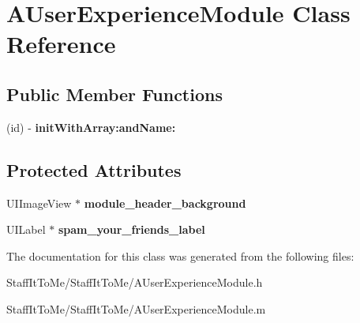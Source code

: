 \hypertarget{interface_a_user_experience_module}{
\section{\-A\-User\-Experience\-Module \-Class \-Reference}
\label{interface_a_user_experience_module}
}
\subsection*{\-Public \-Member \-Functions}
\begin{DoxyCompactItemize}
\item 
\hypertarget{interface_a_user_experience_module_ae9e5c8978fa4448560240bb2caa73ce8}{
(id) -\/ {\bfseries init\-With\-Array\-:and\-Name\-:}}
\label{interface_a_user_experience_module_ae9e5c8978fa4448560240bb2caa73ce8}

\end{DoxyCompactItemize}
\subsection*{\-Protected \-Attributes}
\begin{DoxyCompactItemize}
\item 
\hypertarget{interface_a_user_experience_module_a39f9675786872edf3d68d57eeaea9cad}{
\-U\-I\-Image\-View $\ast$ {\bfseries module\-\_\-header\-\_\-background}}
\label{interface_a_user_experience_module_a39f9675786872edf3d68d57eeaea9cad}

\item 
\hypertarget{interface_a_user_experience_module_aea8f2a9420fbb67db8236069e5de880a}{
\-U\-I\-Label $\ast$ {\bfseries spam\-\_\-your\-\_\-friends\-\_\-label}}
\label{interface_a_user_experience_module_aea8f2a9420fbb67db8236069e5de880a}

\end{DoxyCompactItemize}


\-The documentation for this class was generated from the following files\-:\begin{DoxyCompactItemize}
\item 
\-Staff\-It\-To\-Me/\-Staff\-It\-To\-Me/\-A\-User\-Experience\-Module.\-h\item 
\-Staff\-It\-To\-Me/\-Staff\-It\-To\-Me/\-A\-User\-Experience\-Module.\-m\end{DoxyCompactItemize}
